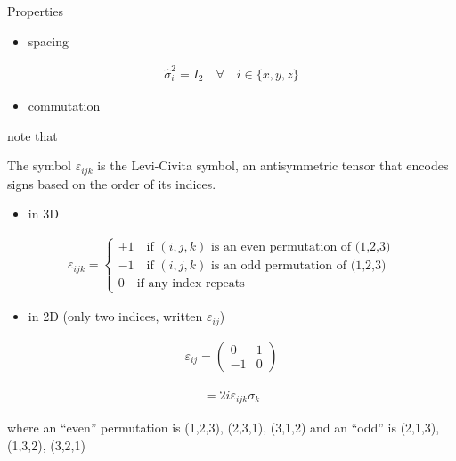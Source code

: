\documentclass[
]{article}
\providecommand{\tightlist}{%
  \setlength{\itemsep}{0pt}\setlength{\parskip}{0pt}}
\begin{document}
Properties

\begin{itemize}
	\tightlist
	\item
	      spacing
\end{itemize}

\begin{gather*}
	\hat{\sigma}^2_i=I_2\quad \forall \quad i\in\{x,y,z\}
\end{gather*}

\begin{itemize}
	\tightlist
	\item
	      commutation
\end{itemize}

note that

The symbol \(\varepsilon_{ijk}\) is the Levi-Civita symbol, an
antisymmetric tensor that encodes signs based on the order of its
indices.

\begin{itemize}
	\tightlist
	\item
	      in 3D
\end{itemize}

\begin{gather*}
	\varepsilon_{ijk}=\begin{cases}
		+1\quad \text{if $(i,j,k)$ is an even permutation of (1,2,3)} \\
		-1\quad \text{if $(i,j,k)$ is an odd permutation of (1,2,3)}  \\
		0\quad\text{if any index repeats}
	\end{cases}
\end{gather*}

\begin{itemize}
	\tightlist
	\item
	      in 2D (only two indices, written \(\varepsilon_{ij}\))
\end{itemize}

\begin{gather*}
	\varepsilon_{ij}=\begin{pmatrix}0 & 1 \\ -1 & 0\end{pmatrix}
\end{gather*}

\begin{gather*}
	[\sigma_i,\sigma_j]=2i\varepsilon_{ijk}\sigma_k
\end{gather*}

where an ``even'' permutation is (1,2,3), (2,3,1), (3,1,2) and an
``odd'' is (2,1,3), (1,3,2), (3,2,1)
\end{document}
